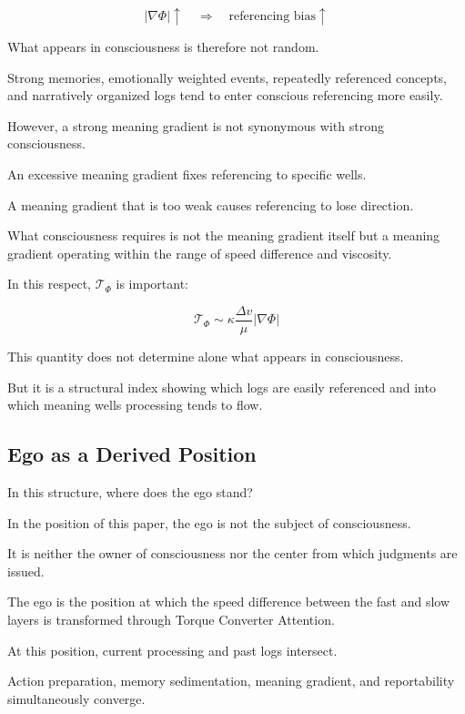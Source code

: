 \begin{equation}
|\nabla \Phi| \uparrow \quad \Rightarrow \quad \text{referencing bias} \uparrow
\end{equation}

What appears in consciousness is therefore not random.

Strong memories, emotionally weighted events, repeatedly referenced concepts, and narratively organized logs tend to enter conscious referencing more easily.

However, a strong meaning gradient is not synonymous with strong consciousness.

An excessive meaning gradient fixes referencing to specific wells.

A meaning gradient that is too weak causes referencing to lose direction.

What consciousness requires is not the meaning gradient itself but a meaning gradient operating within the range of speed difference and viscosity.

In this respect, $\mathcal{T}_{\Phi}$ is important:

\begin{equation}
\mathcal{T}_{\Phi} \sim \kappa \frac{\Delta v}{\mu} |\nabla \Phi|
\end{equation}

This quantity does not determine alone what appears in consciousness.

But it is a structural index showing which logs are easily referenced and into which meaning wells processing tends to flow.

\subsection{Ego as a Derived Position}


In this structure, where does the ego stand?

In the position of this paper, the ego is not the subject of consciousness.

It is neither the owner of consciousness nor the center from which judgments are issued.

The ego is the position at which the speed difference between the fast and slow layers is transformed through Torque Converter Attention.

At this position, current processing and past logs intersect.

Action preparation, memory sedimentation, meaning gradient, and reportability simultaneously converge.

